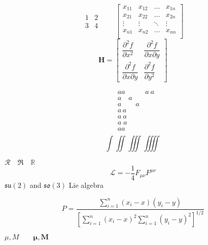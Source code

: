 \documentclass{article}
\begin{document}
	\[
	\begin{matrix}
	1 & 2 \\ 3 & 4
	\end{matrix} \qquad
	\begin{bmatrix}
	x_{11} & x_{12} & \ldots & x_{1n}\\
	x_{21} & x_{22} & \ldots & x_{2n}\\
	\vdots & \vdots & \ddots & \vdots\\
	x_{n1} & x_{n2} & \ldots & x_{nn}\\
	\end{bmatrix}
	\]
	\[
	\mathbf{H}=
	\begin{bmatrix}
	\dfrac{\partial^2 f}{\partial x^2} &
	\dfrac{\partial^2 f}
	{\partial x \partial y} \\[8pt]
	\dfrac{\partial^2 f}
	{\partial x \partial y} &
	\dfrac{\partial^2 f}{\partial y^2}
	\end{bmatrix}
	\]

	\newpage
	\begin{equation}
		\begin{aligned}
			&aa
			&a\ a\\
			&a\quad a\\
			&a\qquad a\\
			&a\,a\\
			&a\:a\\
			&a\;a\\
			&a\!a\\
		\end{aligned}
	\end{equation}
	$$\int \iint \iiint \iiiint$$



	$\mathcal{R} \quad \mathfrak{R}
	\quad \mathbb{R}$
	\[\mathcal{L}
	= -\frac{1}{4}F_{\mu\nu}F^{\mu\nu}\]
	$\mathfrak{su}(2)$ and
	$\mathfrak{so}(3)$ Lie algebra


	\[
	P = \frac
	{\sum_{i=1}^n (x_i- x)(y_i- y)}
	{\displaystyle \left[
	\sum_{i=1}^n (x_i-x)^2
	\sum_{i=1}^n (y_i-y)^2
	\right]^{1/2} }
	\]

	$\mu, M \qquad
	\boldsymbol{\mu}, \boldsymbol{M}$
\end{document}
